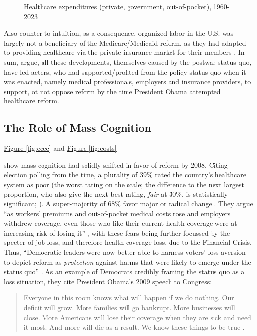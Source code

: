 \documentclass[11pt]{article}
\begin{document}
\begin{figure}[H]
  \sffamily
  \caption{Healthcare expenditures (private, government, out-of-pocket), 1960-2023}
  
  \label{fig:expend_all}
\end{figure}

Also counter to intuition, as a consequence, organized labor in the U.S. was largely not a beneficiary of the Medicare/Medicaid reform, as they had adapted to providing healthcare via the private insurance market for their members \parencite[][]{Hacker1998}. In sum, \textcite[][]{Jacobs2014} argue, all these  developments, themselves caused by the postwar status quo, have led actors, who had supported/profited from the policy status quo when it was enacted, namely medical professionals, employers and insurance providers, to support, ot not oppose reform by the time President Obama attempted healthcare reform.

\subsection*{The Role of Mass Cognition}

\hyperref[fig:ecec]{Figure \ref*{fig:ecec}} and \hyperref[fig:costs]{Figure \ref*{fig:costs}}

\textcite[][]{Jacobs2014} show mass cognition had solidly shifted in favor of reform by 2008. Citing election polling from the time, a plurality of 39\% rated the country's healthcare system as poor (the worst rating on the scale; the difference to the next largest proportion, who also give the next best rating, \textit{fair} at 30\%, is statistically significant; ). A super-majority of 68\% favor major or radical change \parencite[][p. 2058]{Blendon2008}. They argue \enquote{as workers' premiums and out-of-pocket medical costs rose and employers withdrew coverage, even those who like their current health coverage were at increasing risk of losing it} , with these fears being further focussed by the specter of job loss, and therefore health coverage loss, due to the Financial Crisis. Thus, \enquote{Democratic leaders were now better able to harness voters' loss aversion to depict reform as \textit{protection} against harms that were likely to emerge under the status quo} . As an example of Democrats credibly framing the status quo as a loss situation, they cite President Obama's 2009 speech to Congress:

\begin{quote}
  Everyone in this room knows what will happen if we do nothing. Our deficit will grow. More families will go bankrupt. More businesses will close. More Americans will lose their coverage when they are sick and need it most. And more will die as a result. We know these things to be true \parencite[][]{Obama2009}.
\end{quote}
\end{document}

